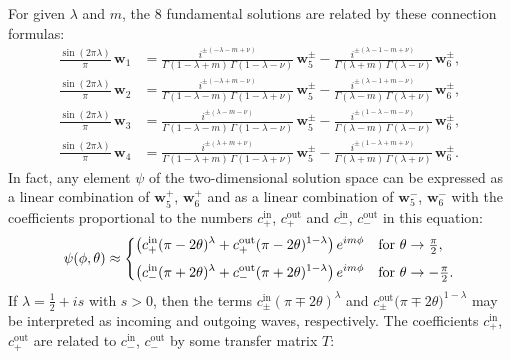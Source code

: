 \documentclass[11pt]{article}
\newcommand{\IN}{\text{in}}
\newcommand{\OUT}{\text{out}}
\newcommand{\ww}{\mathbf{w}}
\begin{document}
For given $\lambda$ and $m$, the $8$ fundamental solutions are related by these connection formulas:
\begin{equation}\label{conrel}
\begin{aligned}
\frac{\sin(2\pi\lambda)}{\pi}\,\ww_{1}
&=\frac{i^{\pm(-\lambda-m+\nu)}}{\Gamma(1-\lambda+m)\,\Gamma(1-\lambda-\nu)}\,
\ww_{5}^{\pm}
-\frac{i^{\pm(\lambda-1-m+\nu)}}{\Gamma(\lambda+m)\,\Gamma(\lambda-\nu)}\,
\ww_{6}^{\pm},\\[3pt]
\frac{\sin(2\pi\lambda)}{\pi}\,\ww_{2}
&=\frac{i^{\pm(-\lambda+m-\nu)}}{\Gamma(1-\lambda-m)\,\Gamma(1-\lambda+\nu)}\,
\ww_{5}^{\pm}
-\frac{i^{\pm(\lambda-1+m-\nu)}}{\Gamma(\lambda-m)\,\Gamma(\lambda+\nu)}\,
\ww_{6}^{\pm},\\[3pt]
\frac{\sin(2\pi\lambda)}{\pi}\,\ww_{3}
&=\frac{i^{\pm(\lambda-m-\nu)}}{\Gamma(1-\lambda-m)\,\Gamma(1-\lambda-\nu)}\,
\ww_{5}^{\pm}
-\frac{i^{\pm(1-\lambda-m-\nu)}}{\Gamma(\lambda-m)\,\Gamma(\lambda-\nu)}\,
\ww_{6}^{\pm},\\[3pt]
\frac{\sin(2\pi\lambda)}{\pi}\,\ww_{4}
&=\frac{i^{\pm(\lambda+m+\nu)}}{\Gamma(1-\lambda+m)\,\Gamma(1-\lambda+\nu)}\,
\ww_{5}^{\pm}
-\frac{i^{\pm(1-\lambda+m+\nu)}}{\Gamma(\lambda+m)\,\Gamma(\lambda+\nu)}\,
\ww_{6}^{\pm}.
\end{aligned}
\end{equation}
In fact, any element $\psi$ of the two-dimensional solution space can be expressed as a linear combination of $\ww_{5}^{+}$, $\ww_{6}^{+}$ and as a linear combination of $\ww_{5}^{-}$, $\ww_{6}^{-}$ with the coefficients proportional to the numbers $c_{+}^{\IN}$, $c_{+}^{\OUT}$ and $c_{-}^{\IN}$, $c_{-}^{\OUT}$ in this equation:
\begin{equation}\label{asform}
\psi(\phi,\theta)\approx \begin{dcases}
\left(c_{+}^{\IN}(\pi-2\theta)^{\lambda}
+c_{+}^{\OUT}(\pi-2\theta)^{1-\lambda}\right)e^{im\phi}
&\text{for }\theta\to\tfrac{\pi}{2},\\[3pt]
\left(c_{-}^{\IN}(\pi+2\theta)^{\lambda}
+c_{-}^{\OUT}(\pi+2\theta)^{1-\lambda}\right)e^{im\phi}
&\text{for }\theta\to-\tfrac{\pi}{2}.
\end{dcases}
\end{equation}
If $\lambda=\frac{1}{2}+is$ with $s>0$, then the terms $c_{\pm}^{\IN}(\pi\mp 2\theta)^{\lambda}$ and $c_{\pm}^{\OUT}(\pi\mp 2\theta\bigr)^{1-\lambda}$ may be interpreted as incoming and outgoing waves, respectively. The coefficients $c_{+}^{\IN}$, $c_{+}^{\OUT}$ are related to $c_{-}^{\IN}$, $c_{-}^{\OUT}$ by some transfer matrix $T$:
\end{document}
